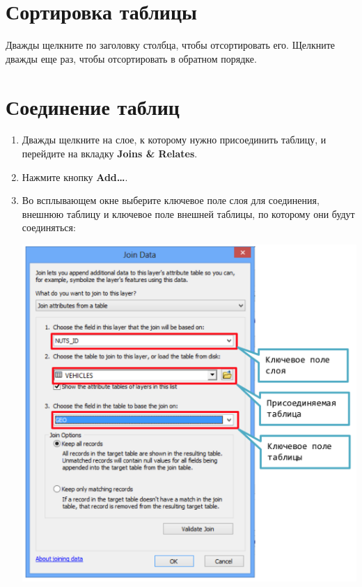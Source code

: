 \documentclass[12pt,]{book}
\begin{document}
\hypertarget{section-38}{%
\section{Сортировка таблицы}\label{section-38}}

Дважды щелкните по заголовку столбца, чтобы отсортировать его. Щелкните дважды еще раз, чтобы отсортировать в обратном порядке.

\hypertarget{section-39}{%
\section{Соединение таблиц}\label{section-39}}

\begin{enumerate}
\def\labelenumi{\arabic{enumi}.}
\item
  Дважды щелкните на слое, к которому нужно присоединить таблицу, и перейдите на вкладку \textbf{Joins \& Relates}.
\item
  Нажмите кнопку \textbf{Add\ldots{}}.
\item
  Во всплывающем окне выберите ключевое поле слоя для соединения, внешнюю таблицу и ключевое поле внешней таблицы, по которому они будут соединяться:

  \includegraphics{images/Appendix/image72.png}
\end{enumerate}
\end{document}

